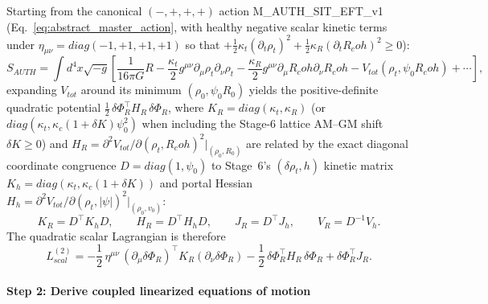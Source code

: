 \documentclass[american,11pt,letterpaper]{article}
\newcommand{\Rcoh}{R_{\mathrm{coh}}}
\def\mathcal#1{#1}%
\def\mathrm#1{#1}%
\def\texttt#1{#1}%
\def\emph#1{#1}%
\def\Rcoh{R_coh}%
\begin{document}
Starting from the canonical $(-,+,+,+)$ action \texttt{M\_AUTH\_SIT\_EFT\_v1} (Eq.~\eqref{eq:abstract_master_action}, with healthy \emph{negative} scalar kinetic terms under $\eta_{\mu\nu} = \mathrm{diag}(-1,+1,+1,+1)$ so that $+\frac{1}{2}\kappa_t(\partial_t\rho_t)^2 + \frac{1}{2}\kappa_R(\partial_t\Rcoh)^2 \ge 0$):
\[
S_{\mathrm{AUTH}} = \int d^4x \sqrt{-g} \left[
\frac{1}{16\pi G} R
- \frac{\kappa_t}{2} g^{\mu\nu} \partial_\mu \rho_t \partial_\nu \rho_t
- \frac{\kappa_R}{2} g^{\mu\nu} \partial_\mu \Rcoh \partial_\nu \Rcoh
- V_{\mathrm{tot}}(\rho_t, \psi_0 \Rcoh)
+ \cdots \right],
\]
expanding $V_{\mathrm{tot}}$ around its minimum $(\rho_0, \psi_0 R_0)$ yields the positive-definite quadratic potential $\frac{1}{2}\,\delta\Phi_R^\top H_R\,\delta\Phi_R$, where $K_R = \mathrm{diag}(\kappa_t, \kappa_R)$ (or $\mathrm{diag}(\kappa_t, \kappa_c(1+\delta K)\psi_0^2)$ when including the Stage-6 lattice AM--GM shift $\delta K \ge 0$) and $H_R = \partial^2 V_{\mathrm{tot}}/\partial(\rho_t, \Rcoh)^2|_{(\rho_0, R_0)}$ are related by the exact diagonal coordinate congruence $D = \mathrm{diag}(1, \psi_0)$ to Stage~6's $(\delta\rho_t, h)$ kinetic matrix $K_h = \mathrm{diag}(\kappa_t, \kappa_c(1+\delta K))$ and portal Hessian $H_h = \partial^2 V_{\mathrm{tot}}/\partial(\rho_t, |\psi|)^2|_{(\rho_0, v_0)}$:
\[
K_R = D^\top K_h D, \qquad H_R = D^\top H_h D, \qquad J_R = D^\top J_h, \qquad V_R = D^{-1} V_h.
\]
The quadratic scalar Lagrangian is therefore
\[
\mathcal{L}^{(2)}_{\mathrm{scal}} = -\frac{1}{2}\,\eta^{\mu\nu}\,(\partial_\mu\delta\Phi_R)^\top K_R (\partial_\nu\delta\Phi_R) - \frac{1}{2}\,\delta\Phi_R^\top H_R\,\delta\Phi_R + \delta\Phi_R^\top J_R.
\]

\paragraph{Step 2: Derive coupled linearized equations of motion}
\end{document}
